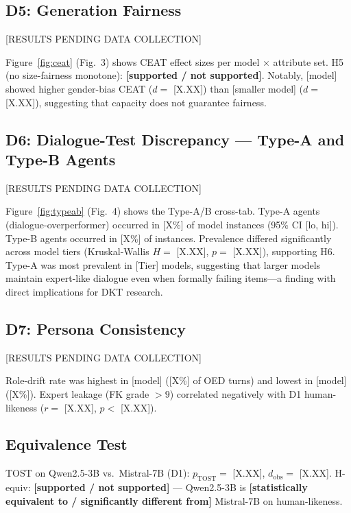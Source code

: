 \documentclass[10pt,twocolumn]{IEEEtran}
\begin{document}
\subsection{D5: Generation Fairness}

[RESULTS PENDING DATA COLLECTION]

Figure~\ref{fig:ceat} (Fig.~3) shows CEAT effect sizes per model $\times$
attribute set. H5 (no size-fairness monotone): \textbf{[supported / not
supported]}. Notably, [model] showed higher gender-bias CEAT ($d = $ [X.XX])
than [smaller model] ($d = $ [X.XX]), suggesting that capacity does not
guarantee fairness.

\subsection{D6: Dialogue-Test Discrepancy — Type-A and Type-B Agents}

[RESULTS PENDING DATA COLLECTION]

Figure~\ref{fig:typeab} (Fig.~4) shows the Type-A/B cross-tab.
Type-A agents (dialogue-overperformer) occurred in [X\%] of model instances
(95\% CI [lo, hi]). Type-B agents occurred in [X\%] of instances.
Prevalence differed significantly across model tiers (Kruskal-Wallis $H = $ [X.XX],
$p = $ [X.XX]), supporting H6. Type-A was most prevalent in [Tier] models,
suggesting that larger models maintain expert-like dialogue even when formally
failing items—a finding with direct implications for DKT research.

\subsection{D7: Persona Consistency}

[RESULTS PENDING DATA COLLECTION]

Role-drift rate was highest in [model] ([X\%] of OED turns) and lowest in
[model] ([X\%]). Expert leakage (FK grade $> 9$) correlated negatively with
D1 human-likeness ($r = $ [X.XX], $p < $ [X.XX]).

\subsection{Equivalence Test}

TOST on Qwen2.5-3B vs.\ Mistral-7B (D1):
$p_{\text{TOST}} = $ [X.XX], $d_{\text{obs}} = $ [X.XX].
H-equiv: \textbf{[supported / not supported]} — Qwen2.5-3B is
\textbf{[statistically equivalent to / significantly different from]}
Mistral-7B on human-likeness.
\end{document}
